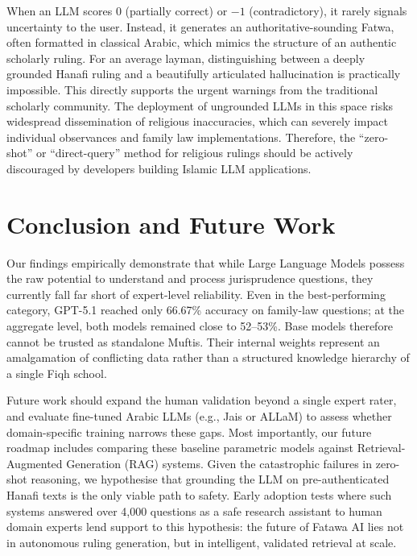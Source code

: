 \documentclass[runningheads]{llncs}
\begin{document}
When an LLM scores $0$ (partially correct) or $-1$ (contradictory), it rarely signals uncertainty to the user. Instead, it generates an authoritative-sounding Fatwa, often formatted in classical Arabic, which mimics the structure of an authentic scholarly ruling. For an average layman, distinguishing between a deeply grounded Hanafi ruling and a beautifully articulated hallucination is practically impossible. This directly supports the urgent warnings from the traditional scholarly community. The deployment of ungrounded LLMs in this space risks widespread dissemination of religious inaccuracies, which can severely impact individual observances and family law implementations. Therefore, the ``zero-shot'' or ``direct-query'' method for religious rulings should be actively discouraged by developers building Islamic LLM applications.

\section{Conclusion and Future Work}

Our findings empirically demonstrate that while Large Language Models possess the raw potential to understand and process jurisprudence questions, they currently fall far short of expert-level reliability. Even in the best-performing category, GPT-5.1 reached only 66.67\% accuracy on family-law questions; at the aggregate level, both models remained close to 52--53\%. Base models therefore cannot be trusted as standalone Muftis. Their internal weights represent an amalgamation of conflicting data rather than a structured knowledge hierarchy of a single Fiqh school.

Future work should expand the human validation beyond a single expert rater, and evaluate fine-tuned Arabic LLMs (e.g., Jais or ALLaM) to assess whether domain-specific training narrows these gaps. Most importantly, our future roadmap includes comparing these baseline parametric models against Retrieval-Augmented Generation (RAG) systems. Given the catastrophic failures in zero-shot reasoning, we hypothesise that grounding the LLM on pre-authenticated Hanafi texts is the only viable path to safety. Early adoption tests where such systems answered over 4{,}000 questions as a safe research assistant to human domain experts lend support to this hypothesis: the future of Fatawa AI lies not in autonomous ruling generation, but in intelligent, validated retrieval at scale.

\end{document}
